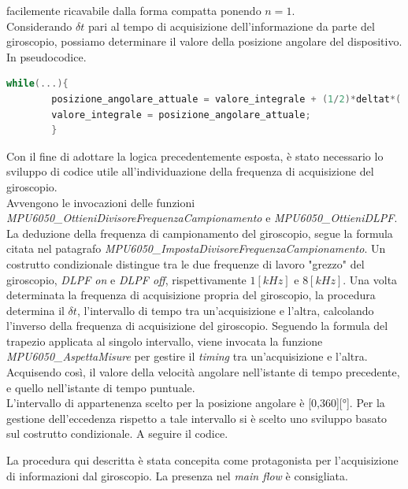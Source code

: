 facilemente ricavabile dalla forma compatta ponendo $n=1$.\\
Considerando $\delta t$ pari al tempo di acquisizione dell'informazione da parte del giroscopio, possiamo determinare il valore della posizione angolare del dispositivo.\\
In pseudocodice.
\begin{lstlisting}[language = Cpp]
    while(...){
        posizione_angolare_attuale = valore_integrale + (1/2)*deltat*( vel_ang_ist_prec + vel_ang_ist_att);
        valore_integrale = posizione_angolare_attuale;
        }
\end{lstlisting}
Con il fine di adottare la logica precedentemente esposta, è stato necessario lo sviluppo di codice utile all'individuazione della frequenza di acquisizione del giroscopio.\\
Avvengono le invocazioni delle funzioni \textit{MPU6050\_OttieniDivisoreFrequenzaCampionamento} e \textit{MPU6050\_OttieniDLPF}.\\
La deduzione della frequenza di campionamento del giroscopio, segue la formula citata nel patagrafo \textit{MPU6050\_ImpostaDivisoreFrequenzaCampionamento}. %
Un costrutto condizionale distingue tra le due frequenze di lavoro "grezzo" del giroscopio, \textit{DLPF on} e \textit{DLPF off}, rispettivamente $1 [kHz]$ e $8 [kHz]$.
Una volta determinata la frequenza di acquisizione propria del giroscopio, la procedura determina il $\delta t$, l'intervallo di tempo tra un'acquisizione e l'altra, calcolando l'inverso della frequenza di acquisizione del giroscopio.
Seguendo la formula del trapezio applicata al singolo intervallo, viene invocata la funzione \textit{MPU6050\_AspettaMisure} per gestire il \textit{timing} tra un'acquisizione e l'altra. Acquisendo così, il valore della velocità angolare nell'istante di tempo precedente, e quello nell'istante di tempo puntuale.\\
L'intervallo di appartenenza scelto per la posizione angolare è [0,360][°]. Per la gestione dell'eccedenza rispetto a tale intervallo si è scelto uno sviluppo basato sul costrutto condizionale.
A seguire il codice.

La procedura qui descritta è stata concepita come protagonista per l'acquisizione di informazioni dal giroscopio. La presenza nel \textit{main flow} è consigliata.

